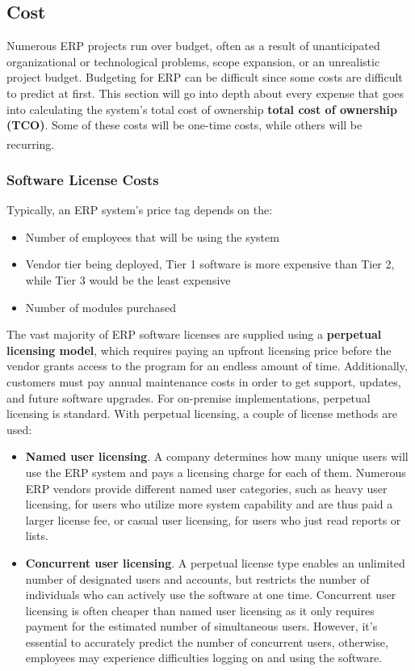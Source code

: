 \subsection{Cost}
Numerous ERP projects run over budget, often as a result of unanticipated organizational or
technological problems, scope expansion, or an unrealistic project budget. Budgeting for ERP can be
difficult since some costs are difficult to predict at first. This section will go into depth about
every expense that goes into calculating the system's total cost of ownership \textbf{total cost of
    ownership (TCO)}. Some of these costs will be one-time costs, while others will be
recurring\textsuperscript{\cite{erp}}.

\subsubsection{Software License Costs}
Typically, an ERP system’s price tag depends on the:
\begin{itemize}
    \item Number of employees that will be using the system
    \item Vendor tier being deployed, Tier 1 software is more expensive than Tier 2, while Tier 3 would be the least expensive
    \item Number of modules purchased
\end{itemize}
The vast majority of ERP software licenses are supplied using a \textbf{perpetual licensing model}, which requires paying an upfront licensing price before the vendor grants access to the program for an endless amount of time. Additionally, customers must pay annual maintenance costs in order to get support, updates, and future software upgrades. For on-premise implementations, perpetual licensing is standard. With perpetual licensing, a couple of license methods are used:
\begin{itemize}
    \item \textbf{Named user licensing}. A company determines how many unique users will use the ERP system and pays a licensing charge for each of them. Numerous ERP vendors provide different named user categories, such as heavy user licensing, for users who utilize more system capability and are thus paid a larger license fee, or casual user licensing, for users who just read reports or lists.
    \item \textbf{Concurrent user licensing}. A perpetual license type enables an unlimited number of designated users and accounts, but restricts the number of individuals who can actively use the software at one time. Concurrent user licensing is often cheaper than named user licensing as it only requires payment for the estimated number of simultaneous users. However, it's essential to accurately predict the number of concurrent users, otherwise, employees may experience difficulties logging on and using the software.
\end{itemize}


